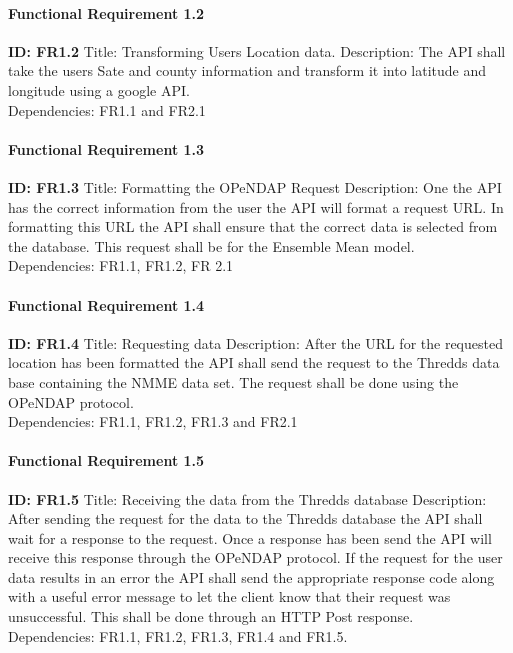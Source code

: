 \documentclass[onecolumn, draftclsnofoot,10pt, compsoc]{article}
\begin{document}
					\paragraph{Functional Requirement 1.2}
						\textbf{ID: FR1.2}\hfill \break
						Title: Transforming Users Location data.\hfill \break
						Description: The API shall take the users Sate and county information and transform it into latitude and longitude using a google API.\\
						Dependencies: FR1.1 and FR2.1\hfill \break

					\paragraph{Functional Requirement 1.3}
						\textbf{ID: FR1.3}\hfill \break
						Title: Formatting the OPeNDAP Request \hfill \break
						Description: One the API has the correct information from the user the API will format a request URL. In formatting this URL the API shall ensure that the correct data is selected from the database. This request shall be for the Ensemble Mean model.\\
						Dependencies: FR1.1, FR1.2, FR 2.1\hfill \break

					\paragraph{Functional Requirement 1.4}
						\textbf{ID: FR1.4}\hfill \break
						Title: Requesting data\hfill \break
						Description: After the URL for the requested location has been formatted the API shall send the request to the Thredds data base containing the NMME data set. The request shall be done using the OPeNDAP protocol.\\
						Dependencies: FR1.1, FR1.2, FR1.3 and FR2.1\hfill \break

					\paragraph{Functional Requirement 1.5}
						\textbf{ID: FR1.5}\hfill \break
						Title: Receiving the data from the Thredds database\hfill \break
						Description: After sending the request for the data to the Thredds database the API shall wait for a response to the request. Once a response has been send the API will receive this response through the OPeNDAP protocol. If the request for the user data results in an error the API shall send the appropriate response code along with a useful error message to let the client know that their request was unsuccessful. This shall be done through an HTTP Post response.\\
						Dependencies: FR1.1, FR1.2, FR1.3, FR1.4 and FR1.5.\hfill \break
\end{document}
